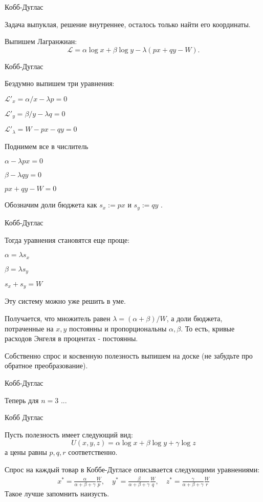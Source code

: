 \documentclass{beamer}
\begin{document}
\begin{frame}{Кобб-Дуглас}

Задача выпуклая, решение внутреннее, осталось только найти его координаты.

Выпишем Лагранжиан:
$$ \mathcal{L} = \alpha \log x + \beta \log y - \lambda (px + qy - W).$$ 

\end{frame}

\begin{frame}{Кобб-Дуглас}

Бездумно выпишем три уравнения:

$\mathcal{L}'_x = \alpha/x - \lambda p = 0$

$\mathcal{L}'_y = \beta/y - \lambda q = 0$

$\mathcal{L}'_{\lambda} = W - p x - qy = 0$

Поднимем все в числитель

$\alpha - \lambda p x= 0$

$\beta - \lambda q y= 0$

$px + qy - W = 0$

Обозначим доли бюджета как $s_x := px$ и $s_y := qy$ .

\end{frame}

\begin{frame}{Кобб-Дуглас}

Тогда уравнения становятся еще проще:

$\alpha = \lambda s_x$

$\beta = \lambda s_y$

$s_x + s_y = W$

Эту систему можно уже решить в уме. 

Получается, что множитель равен $\lambda = (\alpha + \beta)/W$, а доли бюджета, потраченные на $x,y$ постоянны и пропорциональны $\alpha, \beta$. То есть, кривые расходов Энгеля в процентах - постоянны.

Собственно спрос и косвенную полезность выпишем на доске (не забудьте про обратное преобразование).


\end{frame}

\begin{frame}{Кобб-Дуглас}

Теперь для $n = 3$ ...

\end{frame}

\begin{frame}{Кобб Дуглас}

Пусть полезность имеет следующий вид:
$$U(x,y,z) = \alpha \log x + \beta \log y + \gamma \log z$$ 
а цены равны $p, q, r$ соответственно.

Спрос на каждый товар в Коббе-Дугласе описывается следующими уравнениями:
\begin{gather*}
x^{\ast} = \frac{\alpha}{\alpha + \beta + \gamma} \frac{W}{p}, \quad
y^{\ast} = \frac{\beta}{\alpha + \beta + \gamma} \frac{W}{q}, \quad
z^{\ast} = \frac{\gamma}{\alpha + \beta + \gamma} \frac{W}{r}
\end{gather*}
Такое лучше запомнить наизусть. 

\end{frame}
\end{document}
